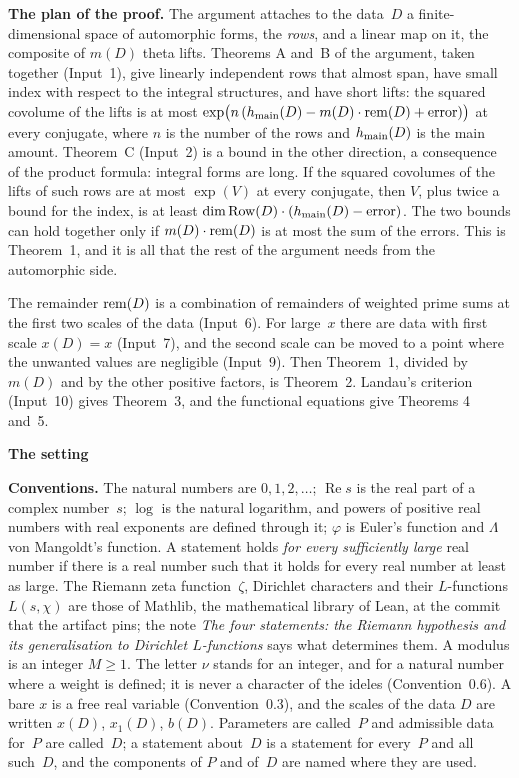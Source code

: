 \documentclass[11pt,a4paper]{article}
\newcommand{\kw}[1]{\emph{#1}}
\newcommand{\m}[1]{\mbox{$#1$}}        %
\newcommand{\sect}[2]{\refstepcounter{section}\label{#2}\par\addvspace{19pt plus 4pt minus 2pt}\Needspace{7\baselineskip}%
  \noindent\llap{{\fontsize{13.2}{16}\selectfont\bfseries\color{inkfaint}\thesection}\hspace{9pt}}%
  {\fontsize{13.2}{16}\selectfont\bfseries\color{ink}#1}\par\nopagebreak\vspace{-1pt}}
\newcommand{\subhead}[1]{\par\addvspace{9pt plus 2pt}\Needspace{4\baselineskip}\noindent\textbf{#1}\enspace\ignorespaces}
\theoremstyle{plainx}
\theoremstyle{uprightx}
\newenvironment{conventions}{\par\addvspace{5pt}\noindent\textbf{Conventions.}\enspace\ignorespaces}{\par\addvspace{3pt}}
\newcommand{\re}{\operatorname{Re}}
\newcommand{\scx}[1]{x(#1)}
\newcommand{\Dm}[1]{m(#1)}
\begin{document}
\subhead{The plan of the proof.} The argument attaches to the data~$D$ a finite-dimensional space of automorphic
forms, the \emph{rows}, and a linear map on it, the composite of $\Dm{D}$ theta lifts. Theorems A and~B of the
argument, taken together (Input~1), give linearly independent rows that almost span, have small index with respect
to the integral structures, and have short lifts: the squared covolume of the lifts is at most
\m{\exp\bigl(n\,(\hmain{D}-\Dm{D}\cdot\rem{D}+\text{error})\bigr)} at every conjugate, where $n$ is the number of the
rows and $h_{\mathrm{main}}(D)$ is the main amount. Theorem~C (Input~2) is a bound in the other direction, a consequence of the
product formula: integral forms are long. If the squared covolumes of the lifts of such rows are at most
\m{\exp(V)} at every conjugate, then $V$, plus twice a bound for the index, is at least
\m{\rowDim{D}\cdot(\hmain{D}-\text{error})}. The two bounds can hold together only if \m{\Dm{D}\cdot\rem{D}} is at most
the sum of the errors. This is Theorem~1, and it is all that the rest of the argument
needs from the automorphic side.

The remainder $\mathrm{rem}(D)$ is a combination of remainders of weighted prime sums at the first two scales of the
data (Input~6). For large~$x$ there are data with first scale \m{\scx{D}=x} (Input~7), and the second scale can be moved to a
point where the unwanted values are negligible (Input~9). Then Theorem~1, divided by~$\Dm{D}$ and by the other
positive factors, is Theorem~2. Landau's criterion (Input~10) gives Theorem~3, and the functional equations give
Theorems 4 and~5.

\sect{The setting}{s:setting}
\begin{conventions}\label{c:conventions}
The natural numbers are \m{0,1,2,\dots}; $\re s$ is the real part of a complex number~$s$; $\log$ is the natural
logarithm, and powers of positive real numbers with real exponents are defined through it; $\varphi$ is Euler's
function and $\Lambda$ von Mangoldt's function. A statement holds \kw{for every sufficiently large} real number
if there is a real number such that it holds for every real number at least as large. The Riemann zeta
function~$\zeta$, Dirichlet characters and their $L$-functions \m{L(s,\chi)} are those of Mathlib, the mathematical
library of Lean, at the commit that the artifact pins; the note \emph{The four statements: the Riemann hypothesis
and its generalisation to Dirichlet $L$-functions} says what determines them. A modulus is an integer \m{M\ge1}. The letter $\nu$ stands for an integer, and for a natural number where a weight is defined; it is never a character of the ideles (Convention~0.6). A bare $x$ is a free real variable (Convention~0.3), and the scales of the data $D$ are written $x(D)$, $x_1(D)$, $b(D)$.
Parameters are called~$P$ and admissible data for~$P$ are called~$D$; a statement about~$D$ is a statement for
every~$P$ and all such~$D$, and the components of $P$ and of~$D$ are named where they are used.
\end{conventions}
\end{document}
